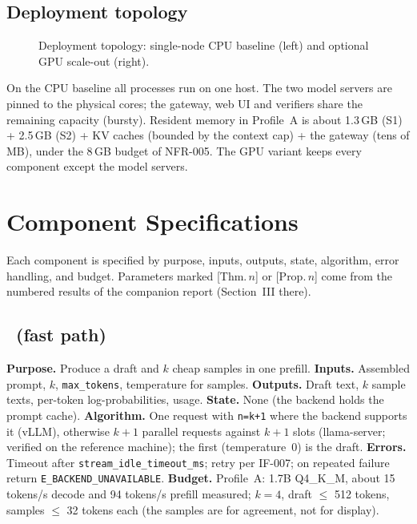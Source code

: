 \documentclass[11pt,a4paper]{article}
\begin{document}
\subsection{Deployment topology}
\begin{figure}[h]\centering\caption{Deployment topology: single-node CPU baseline (left) and optional GPU scale-out (right).}\label{fig:deploy}\end{figure}
On the CPU baseline all processes run on one host. The two model servers are pinned to the physical cores; the gateway, web UI and verifiers share the remaining capacity (bursty). Resident memory in Profile~A is about 1.3\,GB (S1) + 2.5\,GB (S2) + KV caches (bounded by the context cap) + the gateway (tens of MB), under the 8\,GB budget of NFR-005. The GPU variant keeps every component except the model servers.

\section{Component Specifications}
\label{sec:components}
Each component is specified by purpose, inputs, outputs, state, algorithm, error handling, and budget. Parameters marked [Thm.\,$n$] or [Prop.\,$n$] come from the numbered results of the companion report (Section~III there).

\subsection{\Sone\ (fast path)}
\textbf{Purpose.} Produce a draft and $k$ cheap samples in one prefill. \textbf{Inputs.} Assembled prompt, $k$, \texttt{max\_tokens}, temperature for samples. \textbf{Outputs.} Draft text, $k$ sample texts, per-token log-probabilities, usage. \textbf{State.} None (the backend holds the prompt cache). \textbf{Algorithm.} One request with \texttt{n=k+1} where the backend supports it (vLLM), otherwise $k+1$ parallel requests against $k+1$ slots (llama-server; verified on the reference machine); the first (temperature~0) is the draft. \textbf{Errors.} Timeout after \texttt{stream\_idle\_timeout\_ms}; retry per IF-007; on repeated failure return \texttt{E\_BACKEND\_UNAVAILABLE}. \textbf{Budget.} Profile~A: 1.7B Q4\_K\_M, about 15 tokens/s decode and 94 tokens/s prefill measured; $k=4$, draft $\le$ 512 tokens, samples $\le$ 32 tokens each (the samples are for agreement, not for display).
\end{document}
